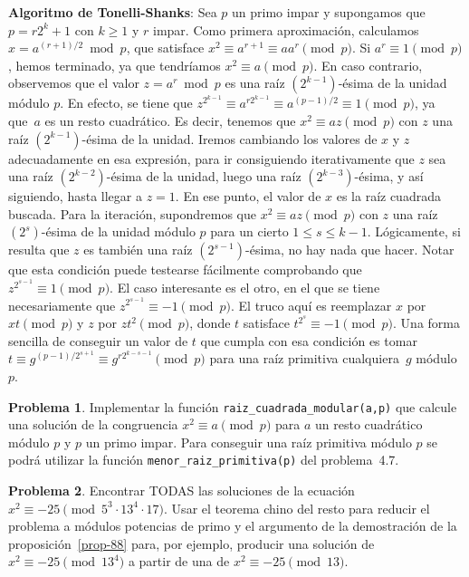 \documentclass[a4paper, 11pt]{article}
\newcounter{numerodetema}
\theoremstyle{plain}
\theoremstyle{definition}
\newtheorem{prob}{Problema}[numerodetema]
\begin{document}
{\bf Algoritmo de Tonelli-Shanks}:
Sea $p$ un primo impar y supongamos que $p=r2^k+1$ con $k\geq 1$ y
$r$ impar. Como primera aproximación, calculamos $x=a^{(r+1)/2}\bmod{p}$, que
satisface $x^2\equiv a^{r+1}\equiv aa^r\pmod{p}$. Si $a^r\equiv 1\pmod{p}$,
hemos terminado, ya que tendríamos $x^2\equiv a\pmod{p}$. En caso
contrario, observemos que el valor $z=a^r\bmod{p}$ es una raíz
$(2^{k-1})$-ésima de la unidad módulo $p$. En efecto, se tiene que
$z^{2^{k-1}}\equiv a^{r2^{k-1}}\equiv a^{(p-1)/2}\equiv1\pmod{p}$, ya que~$a$
es un resto cuadrático. Es decir, tenemos que $x^2\equiv az\pmod{p}$ con
$z$ una raíz $(2^{k-1})$-ésima de la unidad. Iremos cambiando los valores
de $x$ y $z$ adecuadamente en esa expresión, para ir consiguiendo
iterativamente que $z$ sea una raíz $(2^{k-2})$-ésima de la unidad,
luego una raíz $(2^{k-3})$-ésima, y así siguiendo, hasta llegar a
$z=1$. En ese punto, el valor de $x$ es la raíz cuadrada buscada. Para
la iteración, supondremos que $x^2\equiv az\pmod{p}$ con $z$ una raíz
$(2^s)$-ésima de la unidad módulo $p$ para un cierto $1\leq s\leq k-1$.
Lógicamente, si resulta que $z$ es también una raíz $(2^{s-1})$-ésima,
no hay nada que hacer. Notar que esta condición puede testearse
fácilmente comprobando que $z^{2^{s-1}}\equiv 1\pmod{p}$. El caso
interesante es el otro, en el que se tiene necesariamente que
$z^{2^{s-1}}\equiv -1\pmod{p}$. El truco aquí es reemplazar
$x$ por $xt\pmod{p}$ y $z$ por $zt^2\pmod{p}$, donde $t$ satisface
$t^{2^s}\equiv -1\pmod{p}$. Una forma sencilla de conseguir un valor
de $t$ que cumpla con esa condición es tomar $t\equiv g^{(p-1)/2^{s+1}}\equiv
g^{r2^{k-s-1}}\pmod{p}$ para una raíz primitiva cualquiera~$g$ módulo~$p$.

\begin{prob}
Implementar la función \texttt{raiz\_cuadrada\_modular(a,p)} que calcule
una solución de la congruencia $x^2\equiv a\pmod{p}$ para $a$ un resto
cuadrático módulo $p$ y $p$ un primo impar. Para conseguir una raíz primitiva
módulo $p$ se podrá utilizar la función \texttt{menor\_raiz\_primitiva(p)}
del problema~4.7.
\end{prob}

\begin{prob}
Encontrar TODAS las soluciones de la ecuación
$x^2\equiv -25\pmod{5^3\cdot 13^4\cdot 17}$. Usar el teorema chino
del resto para reducir el problema a módulos potencias de primo y
el argumento de la demostración de la proposición~\ref{prop-88} para,
por ejemplo, producir una solución de $x^2\equiv-25\pmod{13^4}$ a
partir de una de $x^2\equiv-25\pmod{13}$.
\end{prob}
\end{document}
